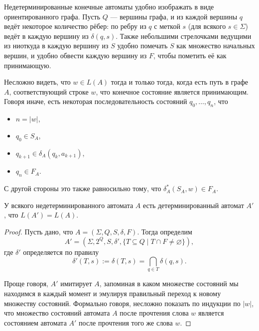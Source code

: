 \documentclass[12pt,a4paper]{article}
\begin{document}
    \begin{remark*}
        Недетерминированные конечные автоматы удобно изображать в виде ориентированного графа. Пусть $Q$ --- вершины графа, и из каждой вершины $q$ ведёт некоторое количество рёбер: по ребру из $q$ с меткой $s$ (для всякого $s \in \Sigma$) ведёт в каждую вершину из $\delta(q, s)$. Также небольшими стрелочками ведущими из ниоткуда в каждую вершину из $S$ удобно помечать $S$ как множество начальных вершин, и удобно обвести каждую вершину из $F$, чтобы пометить её как принимающую. 
    \end{remark*}

    \begin{remark*}
        Несложно видеть, что $w \in L(A)$ тогда и только тогда, когда есть путь в графе $A$, соответствующий строке $w$, что конечное состояние является принимающим. Говоря иначе, есть некоторая последовательность состояний $q_0, \dots, q_n$, что
        \begin{itemize}
            \item $n = |w|$,
            \item $q_0 \in S_A$,
            \item $q_{k+1} \in \delta_A(q_k, a_{k+1})$,
            \item $q_n \in F_A$.
        \end{itemize}
        С другой стороны это также равносильно тому, что $\delta^*_A(S_A, w) \in F_A$.
    \end{remark*}

    \begin{theorem}
        У всякого недетерминированного автомата $A$ есть детерминированный автомат $A'$, что $L(A') = L(A)$.
    \end{theorem}

    \begin{proof}
        Пусть дано, что $A = (\Sigma, Q, S, \delta, F)$. Тогда определим
        \[A' = (\Sigma, 2^Q, S, \delta', \{T \subseteq Q \mid T \cap F \neq \varnothing\}),\]
        где $\delta'$ определяется по правилу
        \[\delta'(T, s) := \delta(T, s) = \bigcap_{q \in T} \delta(q, s).\]

        Проще говоря, $A'$ имитирует $A$, запоминая в каком множестве состояний мы находимся в каждый момент и эмулируя правильный переход к новому множеству состояний. Формально говоря, несложно показать по индукции по $|w|$, что множество состояний автомата $A$ после прочтения слова $w$ является состоянием автомата $A'$ после прочтения того же слова $w$.
    \end{proof}
\end{document}
